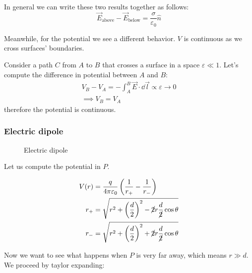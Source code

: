 \documentclass[12pt]{extarticle}
\begin{document}
In general we can write these two results together as follows:
\begin{equation}
	\label{eq:electric-boundary-condition}
	\vec E_\text{above} - \vec E_\text{below} = \frac{\sigma}{\varepsilon_0} \hat n
\end{equation}

Meanwhile, for the potential we see a different behavior. $V$ is continuous as we cross surfaces' boundaries.

Consider a path $C$ from $A$ to $B$ that crosses a surface in a space $\varepsilon \ll 1$. Let's compute the difference in potential between $A$ and $B$:
\begin{gather}
	V_B - V_A = - \int_A^B \vec E \cdot \dd{\vec l} \propto \varepsilon \to 0 \\
	\implies V_B = V_A
\end{gather}
therefore the potential is continuous.

\subsubsection{Electric dipole}

\begin{figure}[H]
	\centering
	
	\caption{Electric dipole}
	\label{fig:electric-dipole}
\end{figure}

Let us compute the potential in $P$.

\begin{align}
	V(r) & = \frac{q}{4 \pi \varepsilon_0} \left( \frac{1}{r_+} - \frac{1}{r_-} \right)                 \\
	r_+  & = \sqrt{r^2 + \left( \frac{d}{2} \right)^2 - \cancel {2} r \frac{d}{\cancel{2}} \cos \theta} \\
	r_-  & = \sqrt{r^2 + \left( \frac{d}{2} \right)^2 + \cancel {2} r \frac{d}{\cancel{2}} \cos \theta} \\
\end{align}

Now we want to see what happens when $P$ is very far away, which means $r \gg d$.
We proceed by taylor expanding:
\end{document}
